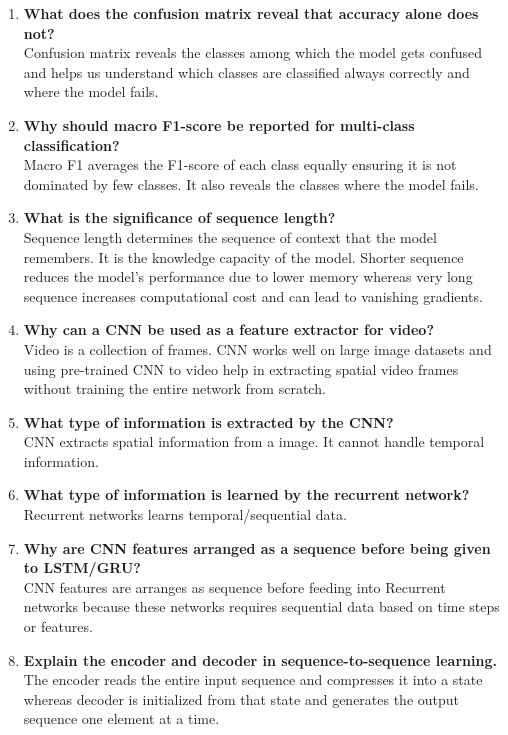 \documentclass[10pt]{article}
\begin{document}
\begin{enumerate}
\item \textbf{What does the confusion matrix reveal that accuracy alone does not?}\\
Confusion matrix reveals the classes among which the model gets confused and helps us understand which classes are classified always correctly and where the model fails.

\item \textbf{Why should macro F1-score be reported for multi-class classification?}\\
Macro F1 averages the F1-score of each class equally ensuring it is not dominated by few classes. It also reveals the classes where the model fails.

\item \textbf{What is the significance of sequence length?}\\
Sequence length determines the sequence of context that the model remembers. It is the knowledge capacity of the model. Shorter sequence reduces the model's performance due to lower memory whereas very long sequence increases computational cost and can lead to vanishing gradients.

\item \textbf{Why can a CNN be used as a feature extractor for video?}\\
Video is a collection of frames. CNN works well on large image datasets and using pre-trained CNN to video help in extracting spatial video frames without training the entire network from scratch.

\item \textbf{What type of information is extracted by the CNN?}\\
CNN extracts spatial information from a image. It cannot handle temporal information.

\item \textbf{What type of information is learned by the recurrent network?}\\
Recurrent networks learns temporal/sequential data.

\item \textbf{Why are CNN features arranged as a sequence before being given to LSTM/GRU?}\\
CNN features are arranges as sequence before feeding into Recurrent networks because these networks requires sequential data based on time steps or features.

\item \textbf{Explain the encoder and decoder in sequence-to-sequence learning.}\\
The encoder reads the entire input sequence and compresses it into a
state whereas decoder is
initialized from that state and generates the output sequence one element at a time.


\end{enumerate}
\end{document}
